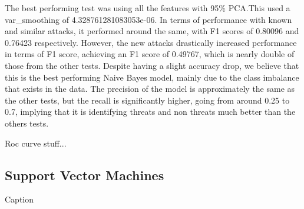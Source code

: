 The best performing test was using all the features with 95\% PCA.This used a var\_smoothing of 4.328761281083053e-06. In terms of performance with known and similar attacks, it performed around the same, with F1 scores of 0.80096 and 0.76423 respectively. However, the new attacks drastically increased performance in terms of F1 score, achieving an F1 score of 0.49767, which is nearly double of those from the other tests. Despite having a slight accuracy drop, we believe that this is the best performing Naive Bayes model, mainly due to the class imbalance that exists in the data. The precision of the model is approximately the same as the other tests, but the recall is significantly higher, going from around 0.25 to 0.7, implying that it is identifying threats and non threats much better than the others tests.

Roc curve stuff...




\subsection{Support Vector Machines}
\begin{table}[!htb]
    \centering
    
    \caption{Caption}
    \label{tab:my_label}
\end{table}
